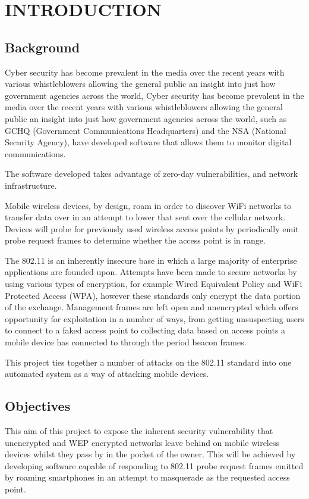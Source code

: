 \section {INTRODUCTION}
\subsection{Background}
Cyber security has become prevalent in the media over the recent years with various whistleblowers allowing the general public an insight into just how government agencies across the world, Cyber security has become prevalent in the media over the recent years with various whistleblowers allowing the general public an insight into just how government agencies across the world, such as GCHQ (Government Communications Headquarters) and the NSA (National Security Agency), have developed software that allows them to monitor digital communications. 

The software developed takes advantage of zero-day vulnerabilities, and network infrastructure.

Mobile wireless devices, by design, roam in order to discover WiFi networks to transfer data over in an attempt to lower that sent over the cellular network. Devices will probe for previously used wireless access points by periodically emit probe request frames to determine whether the access point is in range.

The 802.11 is an inherently insecure base in which a large majority of enterprise applications are founded upon. Attempts have been made to secure networks by using various types of encryption, for example Wired Equivalent Policy and WiFi Protected Access (WPA), however these standards only encrypt the data portion of the exchange. Management frames are left open and unencrypted which offers opportunity for exploitation in a number of ways, from getting unsuspecting users to connect to a faked access point to collecting data based on access points a mobile device has connected to through the period beacon frames.

This project ties together a number of attacks on the 802.11 standard into one automated system as a way of attacking mobile devices.

\subsection{Objectives}
This aim of this project to expose the inherent security vulnerability that unencrypted and WEP encrypted networks leave behind on mobile wireless devices whilst they pass by in the pocket of the owner. This will be achieved by developing software capable of responding to 802.11 probe request frames emitted by roaming smartphones in an attempt to masquerade as the requested access point. 

